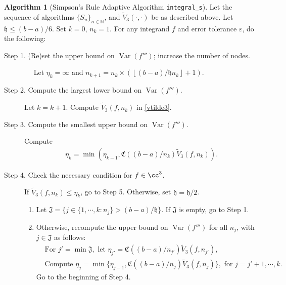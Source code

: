 \documentclass{iitthesis}
\DeclareMathOperator{\Var}{Var}
\theoremstyle{definition}
\newtheorem{algo}{Algorithm}
\theoremstyle{remark}
\begin{document}
\begin{algo} [Simpson's Rule Adaptive Algorithm {\tt integral\_s}] \label{multistageintegalgosimpson}
Let the sequence of algorithms $\{S_n\}_{n\in \mathbb{N}}$, %
and $\widetilde{V}_3(\cdot,\cdot)$ be as described above.
Let $\mathfrak{h}\le (b-a)/6$. Set $k=0$, $n_{k}=1$. For any integrand $f$ and error tolerance $\varepsilon$, do the following: %
\begin{description}
\item[Step 1. (Re)set the upper bound on $\Var(f''')$; increase the number of nodes.] $\quad$ Let $\eta_{k}=\infty$ and $n_{k+1}=n_k\times\left(\left\lfloor(b-a)/\mathfrak{h}n_{k}\right\rfloor+1\right)$.

\item[Step 2. Compute the largest lower bound on {$\Var(f''')$}.] Let $k=k+1$. Compute  $\widetilde{V}_3(f,n_k)$ in \eqref{vtilde3}.%

\item[Step 3. Compute the smallest upper bound on {$\Var(f''')$}.] Compute
    \begin{align*}
        \eta_{k}=\min\left(\eta_{k-1},\mathfrak{C}((b-a)/n_{k})\widetilde{V}_3(f,n_k)\right).
    \end{align*}

\item[Step 4. Check the necessary condition for $f \in \cc^3$.] If $\widetilde{V}_3(f,n_k) \le \eta_{k}$, go to Step 5.
  Otherwise, set $\mathfrak{h} = \mathfrak{h}/2$.
    \begin{enumerate}[label=\alph*)]
      \item Let $\mathfrak{J}=\{j\in\{1, \cdots, k: n_{j}\}> (b-a)/\mathfrak{h}\}$. If $\mathfrak{J}$ is empty, go to Step 1.
      \item Otherwise, recompute the upper bound on $\Var(f''')$ for all $n_{j}$, with $j \in \mathfrak{J}$ as follows:
      \begin{align*}
        &\text{For } j'=\min\mathfrak{J}, \text{ let } \eta_{j'}=\mathfrak{C}((b-a)/n_{j'})\widetilde{V}_3(f,n_{j'}), \\
        &\text{Compute } \eta_{j}=\min\{\eta_{j-1},\mathfrak{C}((b-a)/n_{j})\widetilde{V}_3(f,n_{j})\}, \text{ for } j=j'+1, \cdots, k.
      \end{align*}
      Go to the beginning of Step 4.
    \end{enumerate}



\end{description}
\end{algo}
\end{document}
